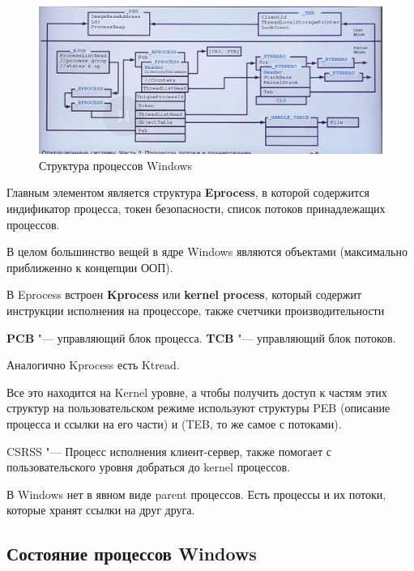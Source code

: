 \documentclass[bachelor, och, book]{SCWorks}
\theoremstyle{remark}
\begin{document}
    \begin{figure}[H]
        \begin{center}
            \includegraphics[scale=0.40]{res/Windows-process-structure.png}
            \caption{Структура процессов Windows}
        \end{center}
    \end{figure}

    Главным элементом является структура \textbf{Eprocess}, в которой содержится индификатор процесса, токен безопасности, список потоков принадлежащих процессов.

    В целом большинство вещей в ядре Windows являются объектами (максимально приближенно к концепции ООП).

    В Eprocess встроен \textbf{Kprocess} или \textbf{kernel process}, который содержит инструкции исполнения на процессоре, также счетчики производительности

    \textbf{PCB} "--- управляющий блок процесса.
    \textbf{TCB} "--- управляющий блок потоков.

    Аналогично Kprocess есть Ktread. 

    Все это находится на Kernel уровне, а чтобы получить доступ к частям этих структур на пользовательском режиме используют структуры PEB (описание процесса и ссылки на его части) и (TEB, то же самое с потоками).

    CSRSS "--- Процесс исполнения клиент-сервер, также помогает с пользовательского уровня добраться до kernel процессов.

    В Windows нет в явном виде parent процессов. Есть процессы и их потоки, которые хранят ссылки на друг друга.


    \subsection{Состояние процессов Windows}
\end{document}
